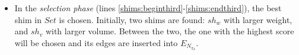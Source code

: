 \documentclass[preprint]{elsarticle}
\begin{document}
{\begin{itemize}
	In this phase, the heuristic that provided the best results, both in terms of time and quality, is based on {\it First-Fit Decreasing}, which is an approximation algorithm for the {\it Bin Packing Problem}\/ \cite{JohnsonGarey1985}. Basically, shims are created by accumulating the following edges, taking $slack_i$\/ as a limit.
	
	\item In the {\it selection phase}\/ (lines \ref{shims:beginthird}-\ref{shims:endthird}), the best shim in $Set$\/ is chosen. Initially, two shims are found: $sh_w$\/ with larger weight, and $sh_v$\/ with larger volume. Between the two, the one with the highest score will be chosen and its edges are inserted into $E_{N_{\pi_k}}$.
	
\end{itemize}

}
\end{document}
